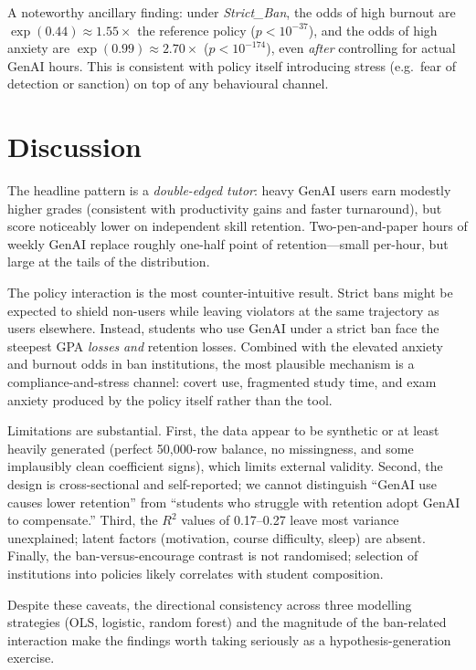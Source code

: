 \documentclass[11pt]{article}
\begin{document}
A noteworthy ancillary finding: under \emph{Strict\_Ban}, the odds of high
burnout are $\exp(0.44) \approx 1.55\times$ the reference policy
($p < 10^{-37}$), and the odds of high anxiety are
$\exp(0.99) \approx 2.70\times$ ($p < 10^{-174}$), even \emph{after}
controlling for actual GenAI hours. This is consistent with policy itself
introducing stress (e.g.\ fear of detection or sanction) on top of any
behavioural channel.

\section{Discussion}
\label{sec:discussion}

The headline pattern is a \emph{double-edged tutor}: heavy GenAI users earn
modestly higher grades (consistent with productivity gains and faster
turnaround), but score noticeably lower on independent skill retention.
Two-pen-and-paper hours of weekly GenAI replace roughly one-half point of
retention---small per-hour, but large at the tails of the distribution.

The policy interaction is the most counter-intuitive result. Strict bans
might be expected to shield non-users while leaving violators at the same
trajectory as users elsewhere. Instead, students who use GenAI under a
strict ban face the steepest GPA \emph{losses} \emph{and} retention losses.
Combined with the elevated anxiety and burnout odds in ban institutions,
the most plausible mechanism is a compliance-and-stress channel: covert
use, fragmented study time, and exam anxiety produced by the policy itself
rather than the tool.

Limitations are substantial. First, the data appear to be synthetic or at
least heavily generated (perfect 50{,}000-row balance, no missingness, and
some implausibly clean coefficient signs), which limits external validity.
Second, the design is cross-sectional and self-reported; we cannot
distinguish ``GenAI use causes lower retention'' from ``students who
struggle with retention adopt GenAI to compensate.'' Third, the
$R^2$ values of 0.17--0.27 leave most variance unexplained; latent factors
(motivation, course difficulty, sleep) are absent. Finally, the
ban-versus-encourage contrast is not randomised; selection of institutions
into policies likely correlates with student composition.

Despite these caveats, the directional consistency across three modelling
strategies (OLS, logistic, random forest) and the magnitude of the
ban-related interaction make the findings worth taking seriously as a
hypothesis-generation exercise.
\end{document}
